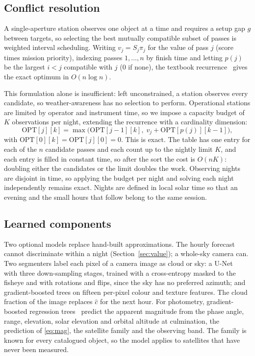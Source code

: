\documentclass[conference]{IEEEtran}
\begin{document}
\subsection{Conflict resolution}
\label{sec:sched}
A single-aperture station observes one object at a time and requires a setup gap
$g$ between targets, so selecting the best mutually compatible subset of passes
is weighted interval scheduling. Writing $v_j = S_j \pi_j$ for the value of pass
$j$ (score times mission priority), indexing passes $1,\dots,n$ by finish time
and letting $p(j)$ be the largest $i<j$ compatible with $j$ ($0$ if none), the
textbook recurrence~\cite{cormen2022introduction} gives the exact optimum in
$O(n\log n)$.

This formulation alone is insufficient: left unconstrained, a station observes
every candidate, so weather-awareness has no selection to perform. Operational
stations are limited by operator and instrument time, so we impose a capacity
budget of $K$ observations per night, extending the recurrence with a
cardinality dimension:
\begin{equation}
\mathrm{OPT}[j][k] = \max\bigl(\mathrm{OPT}[j\!-\!1][k],\;
      v_j + \mathrm{OPT}[p(j)][k\!-\!1]\bigr),
\label{eq:dp}
\end{equation}
with $\mathrm{OPT}[0][k]=\mathrm{OPT}[j][0]=0$. This is exact. The table has one entry for each of the $n$
candidate passes and each count up to the nightly limit $K$, and each entry is
filled in constant time, so after the sort the cost is $O(nK)$: doubling either
the candidates or the limit doubles the work. Observing nights are disjoint
in time, so applying the budget per night and solving each night independently
remains exact. Nights are defined in local solar time so that an evening and the
small hours that follow belong to the same session.

\subsection{Learned components}
\label{sec:learned}
Two optional models replace hand-built approximations. The hourly forecast
cannot discriminate within a night (Section~\ref{sec:value}); a whole-sky
camera can. Two segmenters label each pixel of a camera image as cloud or sky:
a U-Net~\cite{ronneberger2015unet} with three down-sampling stages, trained with
a cross-entropy masked to the fisheye and with rotations and flips, since the sky
has no preferred azimuth; and gradient-boosted trees on fifteen per-pixel colour
and texture features. The cloud fraction of the image replaces $\hat{c}$ for the
next hour. For photometry, gradient-boosted regression
trees~\cite{friedman2001greedy} predict the apparent magnitude from the phase
angle, range, elevation, solar elevation and orbital altitude at culmination,
the prediction of \eqref{eq:mag}, the satellite family and the observing band.
The family is known for every catalogued object, so the model applies to
satellites that have never been measured.
\end{document}
